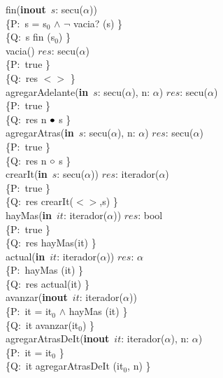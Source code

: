 \documentclass[a4paper,10pt]{article}
\begin{document}
\noindent fin(\textbf{inout}\ $s$: secu($\alpha$)) \ \ \ \ \ \\
\indent \{P:\ s = s$_0$ $\wedge$ $\neg$ vacia? (s) \}  \\
\indent \{Q:\ s \igobs fin (s$_0$) \}\\

\noindent vacia()  \en $res$: secu($\alpha$) \ \ \ \ \ \\
\indent \{P:\ true \}  \\
\indent \{Q:\ res \igobs $<>$ \}\\

\noindent agregarAdelante(\textbf{in}\ $s$: secu($\alpha$), n: $\alpha$)  \en $res$: secu($\alpha$) \ \ \ \ \ \\
\indent \{P:\ true \}  \\
\indent \{Q:\ res \igobs n $\bullet$ s \}\\

\noindent agregarAtras(\textbf{in}\ $s$: secu($\alpha$), n: $\alpha$)  \en $res$: secu($\alpha$) \ \ \ \ \ \\
\indent \{P:\ true \}  \\
\indent \{Q:\ res \igobs n $\circ$ s \}\\

\noindent crearIt(\textbf{in}\ $s$: secu($\alpha$))  \en $res$: iterador($\alpha$) \ \ \ \ \ \\
\indent \{P:\ true \}  \\
\indent \{Q:\ res \igobs crearIt($<>$,s) \}\\

\noindent hayMas(\textbf{in}\ $it$: iterador($\alpha$))  \en $res$: bool \ \ \ \ \ \\
\indent \{P:\ true \}  \\
\indent \{Q:\ res \igobs hayMas(it) \}\\

\noindent actual(\textbf{in}\ $it$: iterador($\alpha$))  \en $res$: $\alpha$ \ \ \ \ \ \\
\indent \{P:\ hayMas (it) \}  \\
\indent \{Q:\ res \igobs actual(it) \}\\

\noindent avanzar(\textbf{inout}\ $it$: iterador($\alpha$))\ \ \ \ \ \\
\indent \{P:\ it = it$_0$ $\wedge$ hayMas (it) \}  \\
\indent \{Q:\ it \igobs avanzar(it$_0$) \}\\


\noindent agregarAtrasDeIt(\textbf{inout}\ $it$: iterador($\alpha$), n: $\alpha$) \ \ \ \ \ \\
\indent \{P:\ it = it$_0$ \}  \\
\indent \{Q:\ it \igobs agregarAtrasDeIt (it$_0$, n) \}\\
\end{document}
